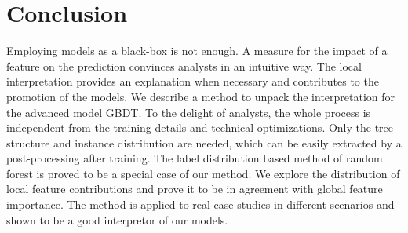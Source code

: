 \section{Conclusion}\label{seccon}
Employing models as a black-box is not enough. A measure for the impact of
a feature on the prediction convinces analysts in an intuitive way. The local interpretation
provides an explanation when necessary and contributes to the promotion of the 
models. We describe a method to unpack the interpretation for the advanced model GBDT.
To the delight of analysts, the whole process is independent from the training details and 
technical optimizations. Only the tree structure and instance distribution are needed, which
can be easily extracted by a post-processing after training. The label distribution based 
method of random forest is proved to be a special case of our method. We explore the 
distribution of local feature contributions and prove it to be in agreement with global feature
importance. The method is applied to real case studies in different scenarios and 
shown to be a good interpretor of our models.  
